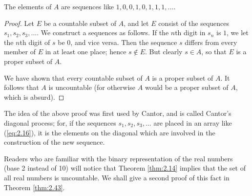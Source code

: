 The elements of $A$ are sequences like $1, 0, 0, 1, 0, 1, 1, 1, ... .$

\begin{proof}
    Let $E$ be a countable subset of $A$,
    and let $E$ consist of the sequences $s_1, s_2 , s_3 , ...$.
    We construct a sequences as follows.
    If the $n$th digit in $s_n$ is $1$,
    we let the $n$th digit of $s$ be $0$, and vice versa.
    Then the sequence $s$ differs from every member of $E$ in at least one place; hence $s \not\in E$.
    But clearly $s \in A$, so that $E$ is a proper subset of $A$.

    We have shown that
    every countable subset of $A$ is a proper subset of $A$.
    It follows that $A$ is uncountable
    (for otherwise $A$ would be a proper subset of $A$, which is absurd).
\end{proof}

The idea of the above proof was first used by Cantor,
and is called Cantor's diagonal process;
for, if the sequences $s_1, s_2 , s_3 ,\dots$ are placed in an array like (\ref{eq:2.16}),
it is the elements on the diagonal which are involved in the construction of the new sequence.

Readers who are familiar with the binary representation of the real numbers (base 2 instead of 10) will notice that
Theorem \ref{thm:2.14} implies that the set of all real numbers is uncountable.
We shall give a second proof of this fact in Theorem \ref{thm:2.43}.